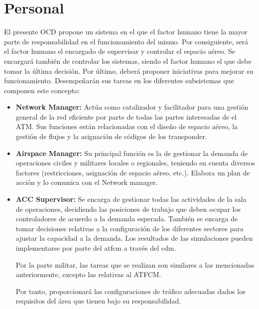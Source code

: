\section{Personal}

El presente OCD propone un sistema en el que el factor humano tiene la mayor parte de responsabilidad en el funcionamiento del mismo. Por consiguiente, será el factor humano el encargado de supervisar y controlar el espacio aéreo. Se encargará también de controlar los sistemas, siendo el factor humano el que debe tomar la última decisión. Por último, deberá proponer iniciativas para mejorar su funcionamiento. Desempeñarán sus tareas en los diferentes subsistemas que componen este concepto:

\begin{itemize}
    \item \textbf{Network Manager:} Actúa como catalizador y facilitador para una gestión general de la red eficiente por parte de todas las partes interesadas de el ATM. Sus funciones están relacionadas con el diseño de espacio aéreo, la gestión de flujos y la asignación de códigos de los transponder.
    
    \item \textbf{Airspace Manager:} Su principal función es la de gestionar la demanda de operaciones civiles y militares locales o regionales, teniendo en cuenta diversos factores (restricciones, asignación de espacio aéreo, etc.). Elabora un plan de acción y lo comunica con el Network manager. 
    
    \item \textbf{ACC Supervisor:} Se encarga de gestionar todas las actividades de la sala de operaciones, decidiendo las posiciones de trabajo que deben ocupar los controladores de acuerdo a la demanda esperada. También se encarga de tomar decisiones relativas a la configuración de los diferentes sectores para ajustar la capacidad a la demanda. Los resultados de las simulaciones pueden implementarse por parte del \acrfull{atfcm} a través del \acrfull{cdm}.
    
    Por la parte militar, las tareas que se realizan son similares a las mencionadas anteriormente, excepto las relativas al ATFCM.
    
    Por tanto, proporcionará las configuraciones de tráfico adecuadas dados los requisitos del área que tienen bajo su responsabilidad.
    

\end{itemize}
